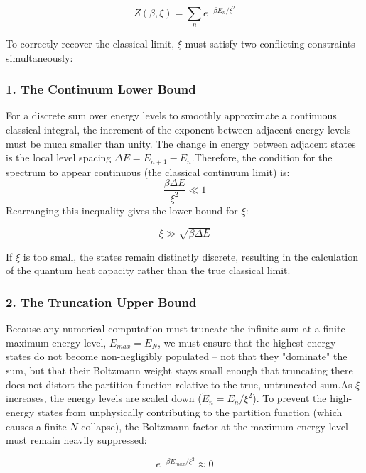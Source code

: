 \documentclass{article}
\numberwithin{equation}{subsection}
\begin{document}
\begin{equation}
Z(\beta, \xi) = \sum_{n} e^{-\beta E_n / \xi^2}
\end{equation}

To correctly recover the classical limit, $\xi$ must satisfy two conflicting constraints simultaneously:\subsubsection*{1. The Continuum Lower Bound}For a discrete sum over energy levels to smoothly approximate a continuous classical integral, the increment of the exponent between adjacent energy levels must be much smaller than unity. The change in energy between adjacent states is the local level spacing $\Delta E = E_{n+1} - E_n$.Therefore, the condition for the spectrum to appear continuous (the classical continuum limit) is:\begin{equation}\frac{\beta \Delta E}{\xi^2} \ll 1\end{equation}Rearranging this inequality gives the lower bound for $\xi$:

\begin{equation}
\xi \gg \sqrt{\beta \Delta E}
\end{equation}

If $\xi$ is too small, the states remain distinctly discrete, resulting in the calculation of the quantum heat capacity rather than the true classical limit.\subsubsection*{2. The Truncation Upper Bound}Because any numerical computation must truncate the infinite sum at a finite maximum energy level, $E_{max} = E_N$, we must ensure that the highest energy states do not become non-negligibly populated -- not that they "dominate" the sum, but that their Boltzmann weight stays small enough that truncating there does not distort the partition function relative to the true, untruncated sum.As $\xi$ increases, the energy levels are scaled down ($\tilde{E}_n = E_n / \xi^2$). To prevent the high-energy states from unphysically contributing to the partition function (which causes a finite-$N$ collapse), the Boltzmann factor at the maximum energy level must remain heavily suppressed:

\begin{equation}
e^{-\beta E_{max} / \xi^2} \approx 0
\end{equation}
\end{document}
